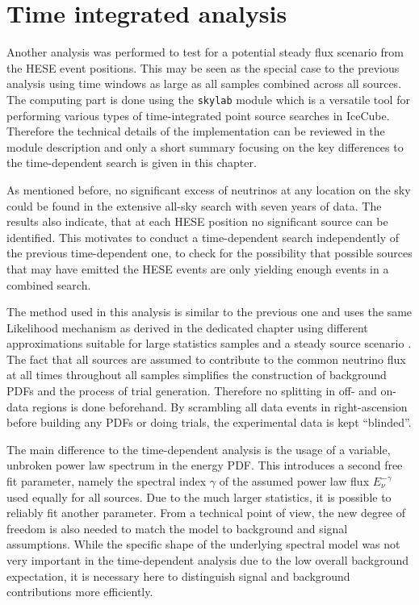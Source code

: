 \chapter{Time integrated analysis}

Another analysis was performed to test for a potential steady flux scenario from the HESE event positions.
This may be seen as the special case to the previous analysis using time windows as large as all samples combined across all sources.
The computing part is done using the \lstinline!skylab!  module which is a versatile tool for performing various types of time-integrated point source searches in IceCube.
Therefore the technical details of the implementation can be reviewed in the module description and only a short summary focusing on the key differences to the time-dependent search is given in this chapter.

As mentioned before, no significant excess of neutrinos at any location on the sky could be found in the extensive all-sky search with seven years of data.
The results also indicate, that at each HESE position no significant source can be identified.
This motivates to conduct a time-dependent search independently of the previous time-dependent one, to check for the possibility that possible sources that may have emitted the HESE events are only yielding enough events in a combined search.

The method used in this analysis is similar to the previous one and uses the same Likelihood mechanism as derived in the dedicated chapter using different approximations suitable for large statistics samples and a steady source scenario .
The fact that all sources are assumed to contribute to the common neutrino flux at all times throughout all samples simplifies the construction of background PDFs and the process of trial generation.
Therefore no splitting in off- and on-data regions is done beforehand.
By scrambling all data events in right-ascension before building any PDFs or doing trials, the experimental data is kept \enquote{blinded}.

The main difference to the time-dependent analysis is the usage of a variable, unbroken power law spectrum in the energy PDF.
This introduces a second free fit parameter, namely the spectral index $\gamma$ of the assumed power law flux $E_\nu^{-\gamma}$ used equally for all sources.
Due to the much larger statistics, it is possible to reliably fit another parameter.
From a technical point of view, the new degree of freedom is also needed to match the model to background and signal assumptions.
While the specific shape of the underlying spectral model was not very important in the time-dependent analysis due to the low overall background expectation, it is necessary here to distinguish signal and background contributions more efficiently.

